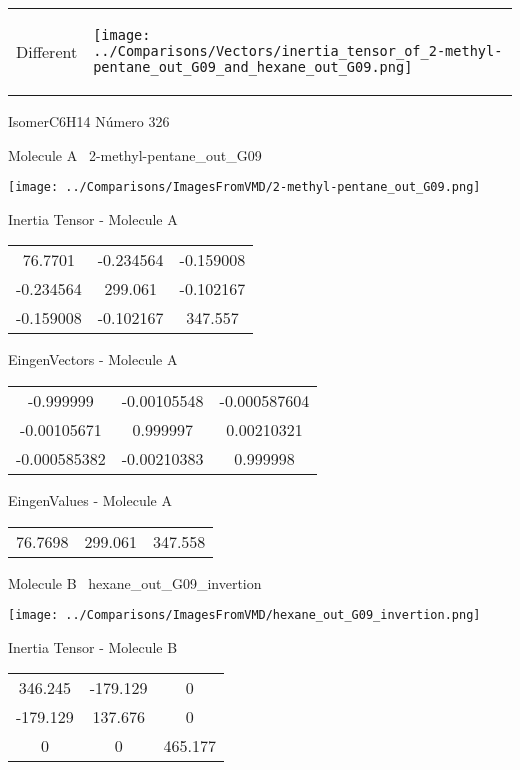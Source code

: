 \vtab[-5mm]
\begin{tabular}{*{2}{m{}}}
\begin{center}
\textcolor{NavyBlue}{\Large Different}
\end{center}
&
\begin{center}
\texttt{[image: ../Comparisons/Vectors/inertia\_tensor\_of\_2-methyl-pentane\_out\_G09\_and\_hexane\_out\_G09.png]}
\end{center}
\end{tabular}

 \newpage

\vtab[-3cm]
\begin{center}
{\large IsomerC6H14 \tab Número 326}
\end{center}
\begin{multicols}{2}
\begin{center}

Molecule A \
2-methyl-pentane\_out\_G09

\texttt{[image: ../Comparisons/ImagesFromVMD/2-methyl-pentane\_out\_G09.png]}

Inertia Tensor - Molecule A \\
\begin{tabular}{|c c c|}
76.7701	 & 	-0.234564	 & 	-0.159008	 \\
-0.234564	 & 	299.061	 & 	-0.102167	 \\
-0.159008	 & 	-0.102167	 & 	347.557
\end{tabular}

\vtab
 EingenVectors - Molecule A     \\
\begin{tabular}{|c c c|}
-0.999999	 & 	-0.00105548	 & 	-0.000587604	 \\
-0.00105671	 & 	0.999997	 & 	0.00210321	 \\
-0.000585382	 & 	-0.00210383	 & 	0.999998
\end{tabular}

\vtab
 EingenValues - Molecule A     \\
\begin{tabular}{|c c c|}
76.7698	 & 	299.061	 & 	347.558	 \\
\end{tabular}
\columnbreak

Molecule B \
hexane\_out\_G09\_invertion

\texttt{[image: ../Comparisons/ImagesFromVMD/hexane\_out\_G09\_invertion.png]}

Inertia Tensor - Molecule B \\
\begin{tabular}{|c c c|}
346.245	 & 	-179.129	 & 	0	 \\
-179.129	 & 	137.676	 & 	0	 \\
0	 & 	0	 & 	465.177
\end{tabular}


\end{center}
\end{multicols}
